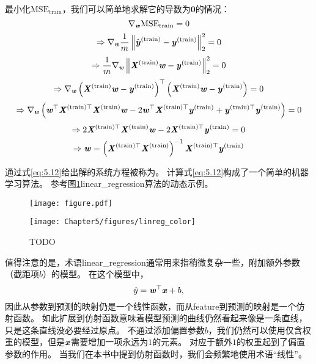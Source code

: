 最小化$\text{MSE}_{\text{train}}$，我们可以简单地求解它的导数为$\mathbf{0}$的情况：
\begin{equation}
\nabla_{\boldsymbol{\mathit{w}}} \text{MSE}_{\text{train}} = 0
\end{equation}
\begin{equation}
\Rightarrow \nabla_{\boldsymbol{\mathit{w}}} \frac{1}{m} \left\lVert \hat{\boldsymbol{\mathit{y}}}^{(\text{train})} - \boldsymbol{\mathit{y}}^{(\text{train})}\right\rVert_2^2 = 0
\end{equation}
\begin{equation}
\Rightarrow \frac{1}{m} \nabla_{\boldsymbol{\mathit{w}}} \left\lVert \boldsymbol{\mathit{X}}^{(\text{train})}\boldsymbol{\mathit{w}} - \boldsymbol{\mathit{y}}^{(\text{train})}\right\rVert_2^2 = 0
\end{equation}
\begin{equation}
\Rightarrow \nabla_{\boldsymbol{\mathit{w}}} \left( \boldsymbol{\mathit{X}}^{(\text{train})}\boldsymbol{\mathit{w}} - \boldsymbol{\mathit{y}}^{(\text{train})} \right)^\top \left( \boldsymbol{\mathit{X}}^{(\text{train})}\boldsymbol{\mathit{w}} - \boldsymbol{\mathit{y}}^{(\text{train})} \right) = 0
\end{equation}
\begin{equation}
\Rightarrow \nabla_{\boldsymbol{\mathit{w}}} \left( 
    \boldsymbol{\mathit{w}}^\top \boldsymbol{\mathit{X}}^{(\text{train})\top}\boldsymbol{\mathit{X}}^{(\text{train})}\boldsymbol{\mathit{w}} - 2\boldsymbol{\mathit{w}}^\top\boldsymbol{\mathit{X}}^{(\text{train})\top} \boldsymbol{\mathit{y}}^{(\text{train})} + \boldsymbol{\mathit{y}}^{(\text{train})\top}\boldsymbol{\mathit{y}}^{(\text{train})}  
  \right) = 0
\end{equation}
\begin{equation}
    \Rightarrow 2\boldsymbol{\mathit{X}}^{(\text{train})\top}\boldsymbol{\mathit{X}}^{(\text{train})} \boldsymbol{\mathit{w}}  -
    2\boldsymbol{\mathit{X}}^{(\text{train})\top} \boldsymbol{\mathit{y}}^{(\text{train})}  = 0
\end{equation}
\begin{equation}
\label{eq:5.12}
    \Rightarrow \boldsymbol{\mathit{w}} =  \left(\boldsymbol{\mathit{X}}^{(\text{train})\top}\boldsymbol{\mathit{X}}^{(\text{train})}
     \right)^{-1} \boldsymbol{\mathit{X}}^{(\text{train})\top} \boldsymbol{\mathit{y}}^{(\text{train})}
\end{equation}


通过式\ref{eq:5.12}给出解的系统方程被称为。
计算式\ref{eq:5.12}构成了一个简单的机器学习算法。
参考图\ref{fig:chap5_linreg}\gls{linear_regression}算法的动态示例。

\begin{figure}[!htb]
\ifOpenSource
\centerline{\texttt{[image: figure.pdf]}}
\else
\centerline{\texttt{[image: Chapter5/figures/linreg\_color]}}
\fi
\caption{TODO}
\label{fig:chap5_linreg}
\end{figure}

值得注意的是，术语{\gls{linear_regression}}通常用来指稍微复杂一些，附加额外参数（截距项$b$）的模型。
在这个模型中，
\begin{equation}
    \hat{y} = \boldsymbol{\mathit{w}}^\top \boldsymbol{\mathit{x}} + b,
\end{equation}
因此从参数到预测的映射仍是一个线性函数，而从\gls{feature}到预测的映射是一个仿射函数。
如此扩展到仿射函数意味着模型预测的曲线仍然看起来像是一条直线，只是这条直线没必要经过原点。
不通过添加偏置参数$b$，我们仍然可以使用仅含权重的模型，但是$\boldsymbol{\mathit{x}}$需要增加一项永远为$1$的元素。
对应于额外$1$的权重起到了偏置参数的作用。
当我们在本书中提到仿射函数时，我们会频繁地使用术语“线性”。

